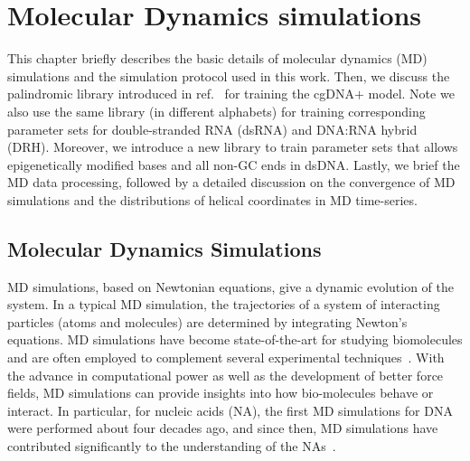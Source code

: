 \chapter{Molecular Dynamics simulations} \label{c3}
This chapter briefly describes the basic details of molecular dynamics (MD) simulations and the simulation protocol used in this work.
Then, we discuss the palindromic library introduced in ref$.$~\cite{patelithesis} for training the cgDNA$+$ model.
Note we also use the same library (in different alphabets) for training corresponding parameter sets for double-stranded RNA (dsRNA) and DNA:RNA hybrid (DRH).
Moreover, we introduce a new library to train parameter sets that allows epigenetically modified bases and all non-GC ends in dsDNA.
Lastly, we brief the MD data processing, followed by a detailed discussion on the convergence of MD simulations and the distributions of helical coordinates in MD time-series.

\section{Molecular Dynamics Simulations}\label{c3:s1}
MD simulations, based on Newtonian
equations, give a dynamic evolution of the system. 
In a typical MD simulation, the trajectories of a system of interacting particles (atoms and molecules) are determined by integrating Newton's equations. 
MD simulations have become state-of-the-art for studying biomolecules and are often employed to complement several experimental techniques~\cite{vsponer2006computational,hospital2015molecular}.
With the advance in computational power as well as the development of better force fields, MD simulations can provide insights into how bio-molecules behave or interact.
In particular, for nucleic acids (NA), the first MD simulations for DNA~\cite{levitt1983computer} were performed about four decades ago, and since then, MD simulations have contributed significantly to the understanding of the NAs~\cite{vsponer2006computational,perez2008towards,da2021sequence,orozco2003theoretical}.

